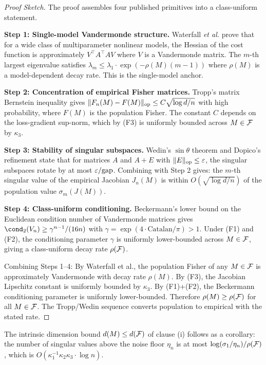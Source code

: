 \begin{proof}[Proof Sketch]
The proof assembles four published primitives into a class-uniform statement.

\textbf{Step 1: Single-model Vandermonde structure.} Waterfall \emph{et al.}\cite{waterfall2006sloppy} prove that for a wide class of multiparameter nonlinear models, the Hessian of the cost function is approximately $V^\top A^\top A V$ where $V$ is a Vandermonde matrix. The $m$-th largest eigenvalue satisfies $\lambda_m \leq \lambda_1 \cdot \exp(-\rho(M)(m-1))$ where $\rho(M)$ is a model-dependent decay rate. This is the single-model anchor.

\textbf{Step 2: Concentration of empirical Fisher matrices.} Tropp's matrix Bernstein inequality\cite{tropp2012user} gives $\|F_n(M) - F(M)\|_{\mathrm{op}} \leq C \sqrt{\log d / n}$ with high probability, where $F(M)$ is the population Fisher. The constant $C$ depends on the loss-gradient sup-norm, which by (F3) is uniformly bounded across $M \in \mathcal{F}$ by $\kappa_3$.

\textbf{Step 3: Stability of singular subspaces.} Wedin's $\sin\theta$ theorem\cite{wedin1972perturbation} and Dopico's refinement\cite{dopico2000sin} state that for matrices $A$ and $A+E$ with $\|E\|_{\mathrm{op}} \leq \varepsilon$, the singular subspaces rotate by at most $\varepsilon / \text{gap}$. Combining with Step 2 gives: the $m$-th singular value of the empirical Jacobian $J_n(M)$ is within $O(\sqrt{\log d / n})$ of the population value $\sigma_m(J(M))$.

\textbf{Step 4: Class-uniform conditioning.} Beckermann's lower bound\cite{beckermann2000condition} on the Euclidean condition number of Vandermonde matrices gives $\cond_2(V_n) \geq \gamma^{n-1} / (16n)$ with $\gamma = \exp(4\cdot\text{Catalan}/\pi) > 1$. Under (F1) and (F2), the conditioning parameter $\gamma$ is uniformly lower-bounded across $M \in \mathcal{F}$, giving a class-uniform decay rate $\rho(\mathcal{F})$.

Combining Steps 1--4: By Waterfall et al., the population Fisher of any $M \in \mathcal{F}$ is approximately Vandermonde with decay rate $\rho(M)$. By (F3), the Jacobian Lipschitz constant is uniformly bounded by $\kappa_3$. By (F1)+(F2), the Beckermann conditioning parameter is uniformly lower-bounded. Therefore $\rho(M) \geq \rho(\mathcal{F})$ for all $M \in \mathcal{F}$. The Tropp/Wedin sequence converts population to empirical with the stated rate.
\end{proof}

The intrinsic dimension bound $d(M) \leq d(\mathcal{F})$ of clause (i) follows as a corollary: the number of singular values above the noise floor $\eta_n$ is at most $\log(\sigma_1/\eta_n) / \rho(\mathcal{F})$, which is $O(\kappa_1^{-1}\kappa_2\kappa_3 \cdot \log n)$.

